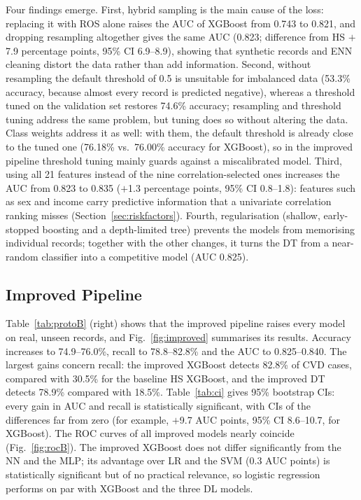 Four findings emerge. First, hybrid sampling is the main cause of the loss:
replacing it with ROS alone raises the AUC of XGBoost from 0.743 to 0.821,
and dropping resampling altogether gives the same AUC (0.823; difference
from HS $+$7.9 percentage points, 95\% CI 6.9--8.9), showing that
synthetic records and ENN cleaning distort the data rather than add
information. Second, without resampling the default threshold of 0.5 is
unsuitable for imbalanced data (53.3\% accuracy, because almost every
record is predicted negative), whereas a threshold tuned on the validation
set restores 74.6\% accuracy; resampling and threshold tuning address the
same problem, but tuning does so without altering the data. Class weights
address it as well: with them, the default threshold is already close to the
tuned one (76.18\% vs.\ 76.00\% accuracy for XGBoost), so in the improved
pipeline threshold tuning mainly guards against a miscalibrated model. Third, using all
21 features instead of the nine correlation-selected ones increases the AUC
from 0.823 to 0.835 ($+$1.3 percentage points, 95\% CI 0.8--1.8): features such as sex and income carry predictive
information that a univariate correlation ranking misses
(Section~\ref{sec:riskfactors}).
Fourth, regularisation (shallow, early-stopped boosting and a depth-limited
tree) prevents the models from memorising individual records; together
with the other changes, it turns the DT from a near-random classifier into a
competitive model (AUC 0.825).

\subsection{Improved Pipeline}
\label{sec:improvedres}

Table~\ref{tab:protoB} (right) shows that the improved pipeline raises
every model on real, unseen records, and Fig.~\ref{fig:improved}
summarises its results. Accuracy
increases to 74.9--76.0\%, recall to 78.8--82.8\% and the AUC to
0.825--0.840. The largest gains concern recall: the improved XGBoost
detects 82.8\% of CVD cases, compared with 30.5\% for the baseline HS
XGBoost, and the improved DT detects 78.9\% compared with 18.5\%.
Table~\ref{tab:ci} gives 95\% bootstrap CIs: every gain in AUC and recall
is statistically significant, with CIs of the differences far from zero
(for example, $+$9.7 AUC points, 95\% CI 8.6--10.7, for XGBoost). The ROC
curves of all improved models nearly coincide (Fig.~\ref{fig:rocB}). The
improved XGBoost does not differ significantly from the NN and the MLP;
its advantage over LR and the SVM (0.3 AUC points) is statistically
significant but of no practical relevance, so logistic regression performs
on par with XGBoost and the three DL models.

